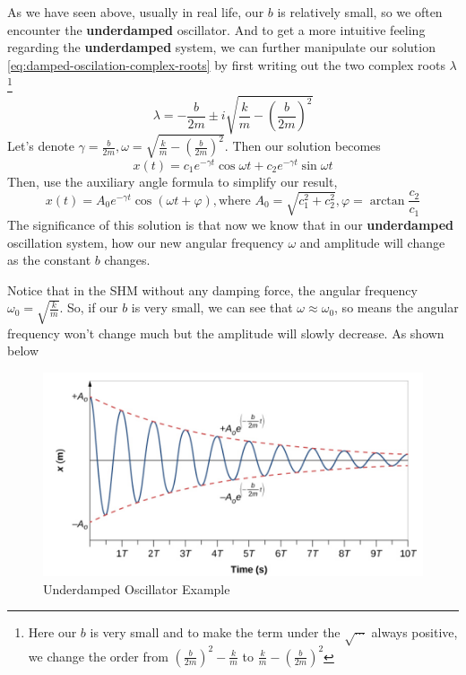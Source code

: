 \documentclass[math,code]{amznotes}
\theoremstyle{remark}
\begin{document}
As we have seen above, usually in real life, our $b$ is relatively small, so we often encounter the \textbf{underdamped} oscillator. And to get a more intuitive feeling regarding the \textbf{underdamped} system, we can further manipulate our solution \ref{eq:damped-oscilation-complex-roots} by first writing out the two complex roots $\lambda$ \footnote{Here our $b$ is very small and to make the term under the $\sqrt{\cdots}$ always positive, we change the order from $(\frac{b}{2m})^2-\frac{k}{m}$ to $\frac{k}{m}-(\frac{b}{2m})^2$}
\begin{equation}
    \lambda=-\frac{b}{2m}\pm i\sqrt{\frac{k}{m}-(\frac{b}{2m})^2}
\end{equation}
Let's denote $\gamma=\frac{b}{2m},\omega=\sqrt{\frac{k}{m}-(\frac{b}{2m})^2}$. Then our solution becomes
\begin{equation}
    x(t)=c_1e^{-\gamma t}\cos \omega t+c_2e^{-\gamma t}\sin \omega t
\end{equation}
Then, use the auxiliary angle formula to simplify our result,
\begin{equation}
    x(t)=A_0e^{-\gamma t}\cos(\omega t+\varphi), \text{where }A_0=\sqrt{c_1^2+c_2^2},\varphi=\arctan\frac{c_2}{c_1}
\end{equation}
The significance of this solution is that now we know that in our \textbf{underdamped} oscillation system, how our new angular frequency $\omega$ and amplitude will change as the constant $b$ changes.

Notice that in the SHM without any damping force, the angular frequency $\omega_0=\sqrt{\frac{k}{m}}$. So, if our $b$ is very small, we can see that $\omega\approx\omega_0$, so means the angular frequency won't change much but the amplitude will slowly decrease. As shown below
\begin{figure}[h]
    \centering
    \includegraphics[width=0.75\linewidth]{images/underdamped-oscillator-example.png}
    \caption{Underdamped Oscillator Example}
    \label{fig:underdamped-oscillator-example}
\end{figure}
\end{document}
